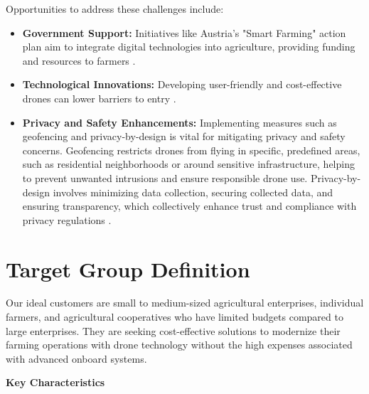 Opportunities to address these challenges include: %

\begin{itemize} 
	\item \textbf{Government Support:} Initiatives like Austria's "Smart Farming" action plan aim to integrate digital technologies into agriculture, providing funding and resources to farmers \citep{smartfarming2023}. 
	\item \textbf{Technological Innovations:} Developing user-friendly and cost-effective drones can lower barriers to entry \citep{guardianagriculture}. %
	\item \textbf{Privacy and Safety Enhancements:} Implementing measures such as geofencing and privacy-by-design is vital for mitigating privacy and safety concerns. Geofencing restricts drones from flying in specific, predefined areas, such as residential neighborhoods or around sensitive infrastructure, helping to prevent unwanted intrusions and ensure responsible drone use. Privacy-by-design involves minimizing data collection, securing collected data, and ensuring transparency, which collectively enhance trust and compliance with privacy regulations \citep{secure_redact_drones_privacy}. 
\end{itemize}

\section{Target Group Definition}

Our ideal customers are small to medium-sized agricultural enterprises, individual farmers, and agricultural cooperatives who have limited budgets compared to large enterprises. They are seeking cost-effective solutions to modernize their farming operations with drone technology without the high expenses associated with advanced onboard systems. %

\textbf{Key Characteristics}


